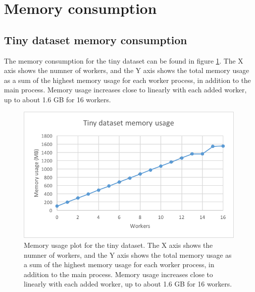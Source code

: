 \section{Memory consumption}

\subsection{Tiny dataset memory consumption}
The memory consumption for the tiny dataset can be found in figure \ref{fig:dataset_1_memory}.
The X axis shows the numner of workers, and the Y axis shows the total memory usage as
a sum of the highest memory usage for each worker process, in addition to the main process. Memory usage increases close to linearly with each added worker,
up to about 1.6 GB for 16 workers.
\begin{figure}[ht]
  \centering
  \includegraphics[width=120mm]{figures/dataset_1/dataset_1_memory.png}
  \caption[Memory usage plot for the tiny dataset.]{Memory usage plot for the tiny dataset. The X axis shows the numner of workers, and the Y axis shows the total memory usage as
  a sum of the highest memory usage for each worker process, in addition to the main process. Memory usage increases close to linearly with each added worker,
  up to about 1.6 GB for 16 workers.}
  \label{fig:dataset_1_memory}
\end{figure}

